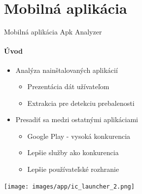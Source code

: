 \documentclass{beamer}
\begin{document}
  \section{Mobilná aplikácia}    
  \begin{frame}[label=lists]{Mobilná aplikácia Apk Analyzer}
 	 \framesubtitle{Úvod}
	\begin{minipage}[htb]{\textwidth}
		\begin{minipage}[t]{0.6\textwidth}
			\begin{itemize}
				\item Analýza nainštalovaných aplikácií
				\begin{itemize}
					\item Prezentácia dát užívateľom
					\item Extrakcia pre detekciu prebalenosti					
				\end{itemize}
				\item Presadiť sa medzi ostatnými aplikáciami
				\begin{itemize}
					\item Google Play - vysoká konkurencia
					\item Lepšie služby ako konkurencia
					\item Lepšie používateľské rozhranie
				\end{itemize}
			\end{itemize}
     		\vfill
		\end{minipage}%
	\hfill
	\centering
		\begin{minipage}[t][][b]{0.35\textwidth}
		\centering
		\texttt{[image: images/app/ic\_launcher\_2.png]}
		\label{fig:app-list}
		\end{minipage}%
	\end{minipage}
  \end{frame}   
     
\end{document}
